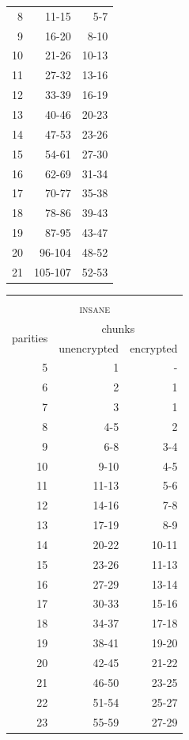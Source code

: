 \documentclass[manuscript,screen,review]{acmart}
\begin{document}
\begin{table}[!ht]
\begin{minipage}{.49\linewidth}
\begin{tabular}{|r|r|r|}
8 & 11-15 & 5-7\\
9 & 16-20 & 8-10\\
10 & 21-26 & 10-13\\
11 & 27-32 & 13-16\\
12 & 33-39 & 16-19\\
13 & 40-46 & 20-23\\
14 & 47-53 & 23-26\\
15 & 54-61 & 27-30\\
16 & 62-69 & 31-34\\
17 & 70-77 & 35-38\\
18 & 78-86 & 39-43\\
19 & 87-95 & 43-47\\
20 &96-104 & 48-52\\
21&105-107 & 52-53\\
\hline
\end{tabular}
\end{minipage}
\begin{minipage}{.49\linewidth}
\centering
\begin{tabular}{|r|r|r|}
\multicolumn{3}{c}{\textsc{}}\\
\multicolumn{3}{c}{\textsc{insane}}\\\hline
\multirow{2}{1.5cm}{\centering 
 parities } 
&\multicolumn{2}{|c|}{ chunks }\\\cline{2-3}
&\multicolumn{1}{|c|}{unencrypted} 
&\multicolumn{1}{|c|}{encrypted} \\\hline\hline
5 & 1     &-   \\
6 & 2     & 1\\
7 & 3     & 1\\ 
8 & 4-5   & 2\\ 
9 & 6-8   & 3-4\\
10 & 9-10  & 4-5\\
11 & 11-13 & 5-6\\
12 & 14-16 & 7-8\\
13 & 17-19 & 8-9\\
14 & 20-22 & 10-11\\
15 & 23-26 & 11-13\\
16 & 27-29 & 13-14\\
17 & 30-33 & 15-16\\
18 & 34-37 & 17-18\\
19 & 38-41 & 19-20\\
20 & 42-45 & 21-22\\
21 & 46-50 & 23-25\\
22 & 51-54 & 25-27\\
23 & 55-59 & 27-29\\

\end{tabular}
\end{minipage}
\end{table}
\end{document}
